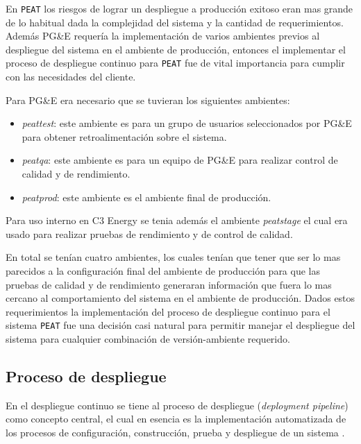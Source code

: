 En \texttt{PEAT} los riesgos de lograr un despliegue a producción exitoso
eran mas grande de lo habitual dada la complejidad del sistema y la cantidad
de requerimientos. Además PG\&E requería la implementación de varios ambientes
previos al despliegue del sistema en el ambiente de producción, entonces
el implementar el proceso de despliegue continuo para \texttt{PEAT} fue de vital
importancia para cumplir con las necesidades del cliente.

\vspace{2.5mm}

Para PG\&E era necesario que se tuvieran los siguientes ambientes:
\begin{itemize}
\item \textit{peattest}: este ambiente es para un grupo de usuarios seleccionados
  por PG\&E para obtener retroalimentación sobre el sistema.
\item \textit{peatqa}: este ambiente es para un equipo de PG\&E para realizar
  control de calidad y de rendimiento.
\item \textit{peatprod}: este ambiente es el ambiente final de producción.
\end{itemize}

Para uso interno en C3 Energy se tenia además el ambiente \textit{peatstage}
el cual era usado para realizar pruebas de rendimiento y de control de calidad.

En total se tenían cuatro ambientes, los cuales tenían que tener que ser lo mas
parecidos a la configuración final del ambiente de producción para que las pruebas
de calidad y de rendimiento generaran información que fuera lo mas cercano al
comportamiento del sistema en el ambiente de producción. Dados estos requerimientos
la implementación del proceso de despliegue continuo para el sistema \texttt{PEAT}
fue una decisión casi natural para permitir manejar el despliegue del sistema para
cualquier combinación de versión-ambiente requerido.

\subsection{Proceso de despliegue}

En el despliegue continuo se tiene al proceso de despliegue (\textit{deployment
  pipeline}) como concepto central, el cual en esencia es la implementación
automatizada de los procesos de configuración, construcción, prueba y despliegue de
un sistema \cite{28_humble_farley_2011}.

\vspace{2.5mm}


